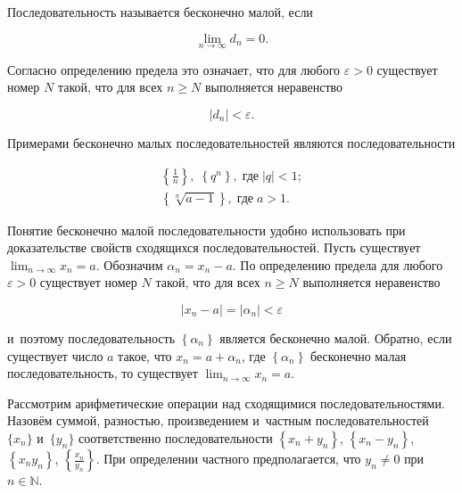 
Последовательность называется бесконечно малой, если 

\begin{equation*}
\displaystyle \lim_{n \to \infty} d_{n} = 0.
\end{equation*}

Согласно определению предела это означает, что для любого $\varepsilon > 0$
существует номер $N$ такой, что для всех $n \geqslant N$ выполняется неравенство

\begin{equation*}
|d_{n}| < \varepsilon.
\end{equation*}

\noindent
Примерами бесконечно малых последовательностей являются последовательности

\begin{gather*}
\displaystyle \left\{ \frac{1}{n} \right\}, \;
\left\{ q^{n} \right\}, \; \text{где} \; |q| < 1; \\
\left\{ \sqrt[n]{a - 1} \right\}, \; \text{где} \; a > 1.
\end{gather*}

Понятие бесконечно малой последовательности удобно использовать
при доказательстве свойств сходящихся последовательностей.
Пусть существует $\displaystyle \lim_{n \to \infty} x_{n} = a$.
Обозначим $\alpha_{n} = x_{n} - a$.
По определению предела для любого $\varepsilon > 0$ существует
номер $N$ такой, что для всех $n \geqslant N$ выполняется неравенство

\begin{equation*}
\left| x_{n} - a \right| = |\alpha_{n}| < \varepsilon
\end{equation*}

\noindent
и~поэтому последовательность $\left\{ \alpha_{n} \right\}$ является бесконечно малой.
Обратно, если существует число $a$ такое, что $x_{n} = a + \alpha_{n}$,
где $\left\{ \alpha_{n} \right\}$ бесконечно малая последовательность,
то существует $\displaystyle \lim_{n \to \infty} x_{n} = a$.

Рассмотрим арифметические операции над сходящимися последовательностями.
Назовём суммой, разностью, произведением и~частным последовательностей
$\{ x_{n} \}$ и~$\{ y_{n} \}$ соответственно последовательности
$\left\{ x_{n} + y_{n} \right\}$,
$\left\{ x_{n} - y_{n} \right\}$,
$\left\{ x_{n} y_{n} \right\}$,
$\displaystyle \left\{ \frac{x_{n}}{y_{n}} \right\}$.
При определении частного предполагается, что $y_{n} \ne 0$ при $n \in \mathbb{N}$.

